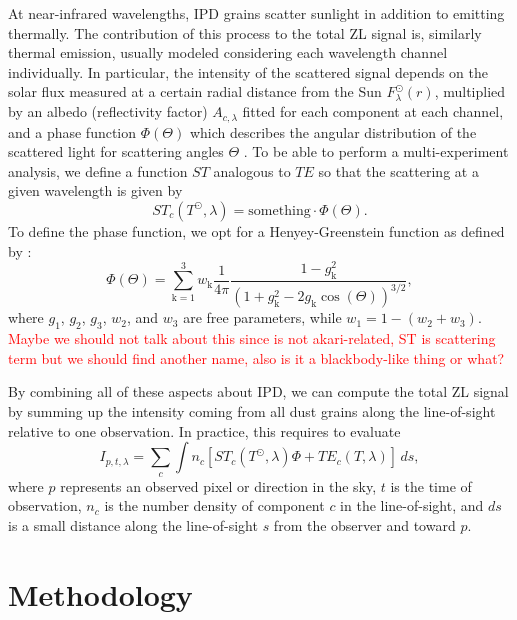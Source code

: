 \documentclass{aa}
\newcommand{\angela}[0]{\textcolor{red}}
\begin{document}
At near-infrared wavelengths, IPD grains scatter sunlight in addition to 
emitting thermally. The contribution of this process to the total ZL signal 
is, similarly thermal emission, usually modeled considering each wavelength 
channel individually. In particular, the intensity of the scattered signal 
depends on the solar flux measured at a certain radial distance from the Sun 
$F_\lambda^\odot(r)$, multiplied by an albedo (reflectivity factor) $A_{c, \lambda}$ 
fitted for each component at each channel, and a phase function $\Phi(\Theta)$ 
which describes the angular distribution of the scattered light for scattering angles
$\Theta$ \citep{kelsall1998}. To be able to perform a multi-experiment analysis, we 
define a function $ST$ analogous to $TE$ so that the scattering at a given 
wavelength is given by
\begin{equation}
    ST_c(T^\odot, \lambda) = \mathrm{something}\cdot\Phi(\Theta).
\end{equation}
To define the phase function, we opt for a Henyey-Greenstein function as defined by 
\citet{Hong}:
\begin{equation}
  \Phi(\Theta)=\sum_\mathrm{k=1}^3 w_\mathrm{k} \frac{1}{4\pi}\frac{1-g_\mathrm{k}^2}{(1+g_\mathrm{k}^2-2g_\mathrm{k}\cos(\Theta))^{3/2}},
\label{eq:phase_function}
\end{equation}
where $g_1$, $g_2$, $g_3$, $w_2$, and $w_3$ are free parameters, while \mbox{$w_1=1-(w_2+w_3)$.}
\angela{Maybe we should not talk about this since is not akari-related, 
ST is scattering term but we should find another name, also is it a 
blackbody-like thing or what?}

By combining all of these aspects about IPD, we can compute the total ZL signal by 
summing up the intensity coming from all dust grains along the line-of-sight 
relative to one observation. In practice, this requires to evaluate
\begin{equation}\label{eq:los}
    I_{p,t, \lambda} = \sum_c \int n_c \left[  ST_c(T^\odot, \lambda) \Phi + TE_c(T, \lambda) \right]\,ds,
\end{equation}
where $p$ represents an observed pixel or direction in the sky, $t$ is
the time of observation, $n_c$ is the number density of component $c$
in the line-of-sight, and $ds$ is a small distance along the
line-of-sight $s$ from the observer and toward $p$.

\section{Methodology}
\end{document}
